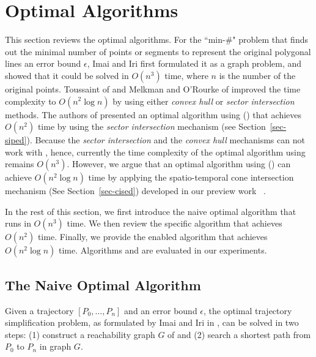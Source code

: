 \section{Optimal Algorithms}
\label{sec-optimal}

This section reviews the optimal \lsa algorithms.
For the ``min-\#" problem that finds out the minimal number of points or segments to represent the original polygonal lines \wrt an error bound $\epsilon$, Imai and Iri \cite{Imai:Optimal} first formulated it as a graph problem, and showed that it could be solved in  $O(n^3)$ time, where $n$ is the number of the original points.
%
Toussaint of \cite{Toussaint:Optimal} and Melkman and O'Rourke of \cite{Melkman:Optimal} improved the time complexity to $O(n^2 \log n)$ by using either \textit{convex hull} or \textit{sector intersection} methods.
%
The authors of \cite{Chan:Optimal} presented an optimal algorithm using \ped (\oped) that achieves $O(n^2)$ time by using the \textit{sector intersection} mechanism (see Section~\ref{sec-siped}).
Because the \textit{sector intersection} and the \textit{convex hull} mechanisms can not work with \sed, hence, currently the time complexity of the optimal algorithm using \sed remains $O(n^3)$.
However, we argue that an optimal \lsa algorithm using \sed (\osed) can achieve $O(n^2 \log n)$ time by applying the spatio-temporal cone intersection mechanism (See Section~\ref{sec-cised}) developed in our preview work \cised~\cite{Lin:Cised}. 

\begin{example}
	\label{exm-alg-optimal}

\end{example}

In the rest of this section, we first introduce the naive optimal \lsa algorithm \cite{Imai:Optimal} that runs in $O(n^3)$ time. We then review the \ped specific algorithm \oped \cite{Chan:Optimal} that achieves $O(n^2)$ time. Finally, we provide the \sed enabled algorithm \osed that achieves $O(n^2 \log n)$ time. 
Algorithms \oped and \osed are evaluated in our experiments.

\subsection{The Naive Optimal Algorithm}
Given a trajectory ${[P_0, \ldots, P_n]}$ and an error bound $\epsilon$, the optimal trajectory simplification problem, as formulated by Imai and Iri in \cite{Imai:Optimal}, can be solved in two steps: (1) construct a reachability graph $G$ of  and (2) search a shortest path from $P_0$ to $P_{n}$ in graph $G$.

